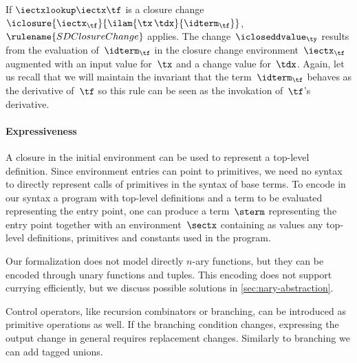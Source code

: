 If $\iectxlookup\iectx\tf$ is a closure change
$\iclosure{\iectx_\tf}{\ilam{\tx\,\tdx}{\idterm_\tf}}$,
$\rulename{SDClosureChange}$ applies. The
change~$\icloseddvalue_\ty$ results from the evaluation
of~$\idterm_\tf$ in the closure change environment~$\iectx_\tf$
augmented with an input value for~$\tx$ and a change value
for~$\tdx$. Again, let us recall that we will maintain the
invariant that the term~$\idterm_\tf$ behaves as the derivative
of~$\tf$ so this rule can be seen as the invokation of~$\tf$'s
derivative.

\paragraph{Expressiveness}

A closure in the initial environment can be used to represent a
top-level definition. Since environment entries can point to
primitives, we need no syntax to directly represent calls of
primitives in the syntax of base terms. To encode in our syntax a
program with top-level definitions and a term to be evaluated
representing the entry point, one can produce a term~$\sterm$
representing the entry point together with an environment~$\sectx$
containing as values any top-level definitions, primitives and
constants used in the program.

Our formalization does not model directly $n$-ary functions, but they can be
encoded through unary functions and tuples. This encoding does not support
currying efficiently, but we discuss possible solutions in
\cref{sec:nary-abstraction}.

Control operators, like recursion combinators or branching, can be
introduced as primitive operations as well. If the branching condition changes,
expressing the output change in general requires replacement changes. Similarly
to branching we can add tagged unions.
